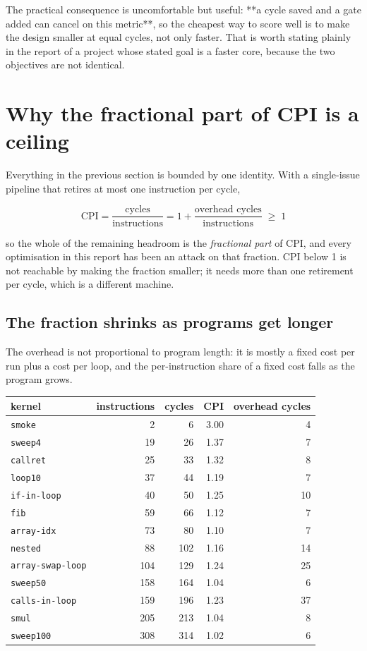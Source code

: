 \documentclass[11pt]{article}
\begin{document}
The practical consequence is uncomfortable but useful: **a cycle saved and a gate added can
cancel on this metric**, so the cheapest way to score well is to make the design smaller at
equal cycles, not only faster. That is worth stating plainly in the report of a project whose
stated goal is a faster core, because the two objectives are not identical.

\section{Why the fractional part of CPI is a ceiling}

Everything in the previous section is bounded by one identity. With a single-issue pipeline
that retires at most one instruction per cycle,

$$\mathrm{CPI} = \frac{\text{cycles}}{\text{instructions}} = 1 + \frac{\text{overhead cycles}}{\text{instructions}} \;\ge\; 1$$

so the whole of the remaining headroom is the \emph{fractional part} of CPI, and every
optimisation in this report has been an attack on that fraction. CPI below 1 is not reachable
by making the fraction smaller; it needs more than one retirement per cycle, which is a
different machine.

\subsection{The fraction shrinks as programs get longer}

The overhead is not proportional to program length: it is mostly a fixed cost per run plus a
cost per loop, and the per-instruction share of a fixed cost falls as the program grows.

\begin{center}
\small
\begin{tabular}{lrrrr}
\toprule
kernel & instructions & cycles & CPI & overhead cycles \\
\midrule
\texttt{smoke}         &   2 &   6 & 3.00 &  4 \\
\texttt{sweep4}        &  19 &  26 & 1.37 &  7 \\
\texttt{callret}       &  25 &  33 & 1.32 &  8 \\
\texttt{loop10}        &  37 &  44 & 1.19 &  7 \\
\texttt{if-in-loop}    &  40 &  50 & 1.25 & 10 \\
\texttt{fib}           &  59 &  66 & 1.12 &  7 \\
\texttt{array-idx}     &  73 &  80 & 1.10 &  7 \\
\texttt{nested}        &  88 & 102 & 1.16 & 14 \\
\texttt{array-swap-loop} & 104 & 129 & 1.24 & 25 \\
\texttt{sweep50}       & 158 & 164 & 1.04 &  6 \\
\texttt{calls-in-loop} & 159 & 196 & 1.23 & 37 \\
\texttt{smul}          & 205 & 213 & 1.04 &  8 \\
\texttt{sweep100}      & 308 & 314 & 1.02 &  6 \\
\bottomrule
\end{tabular}
\end{center}
\end{document}
